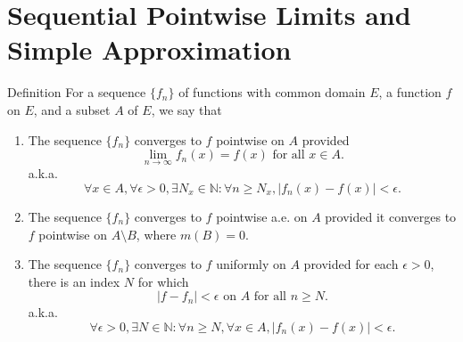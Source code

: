\section{Sequential Pointwise Limits and Simple Approximation}
\begin{flushleft}
    \begin{namedthm*}{Definition}
        For a sequence $\{f_n\}$ of functions with common domain $E$, a function $f$ on $E$, and a subset $A$ of $E$, we say that  
        \begin{enumerate}[label=(\roman*),align=left]
            \item The sequence $\{f_n\}$ converges to $f$ pointwise on $A$ provided
            \[
                \lim_{n\to\infty}f_n(x)=f(x)\text{ for all }x\in A.
            \]
            a.k.a.
            \[
                \forall x\in A, \forall\epsilon>0, \exists N_x\in\mathbb{N}:\forall n\ge N_x, |f_n(x)-f(x)|<\epsilon.
            \]
            \item The sequence $\{f_n\}$ converges to $f$ pointwise a.e. on $A$ provided it converges to $f$ pointwise on $A\setminus B$, where $m(B)=0$.
            \item The sequence $\{f_n\}$ converges to $f$ uniformly on $A$ provided for each $\epsilon>0$, there is an index $N$ for which
            \[
                |f-f_n|<\epsilon\text{ on }A\text{ for all }n\ge N.    
            \]
            a.k.a.
            \[
                \forall\epsilon>0, \exists N\in\mathbb{N}:\forall n\ge N,\forall x\in A, |f_n(x)-f(x)|<\epsilon.
            \]
        \end{enumerate}
    \end{namedthm*}


\end{flushleft}
